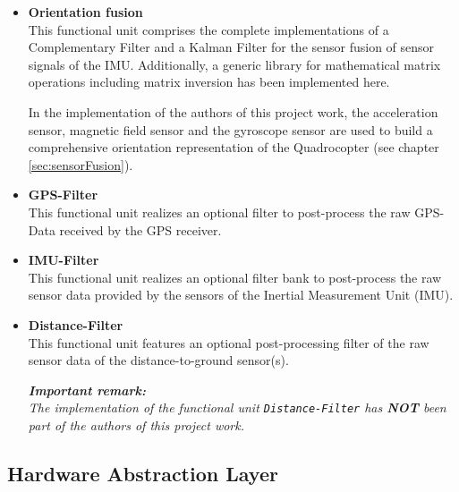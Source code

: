 \begin{itemize}
	\item \textbf{Orientation fusion}\\
	This functional unit comprises the complete implementations of a Complementary Filter and a Kalman Filter for the sensor fusion of sensor signals of the IMU. Additionally, a generic library for mathematical matrix operations including matrix inversion has been implemented here.
	
	In the implementation of the authors of this project work, the acceleration sensor, magnetic field sensor and the gyroscope sensor are used to build a comprehensive orientation representation of the Quadrocopter (see chapter \ref{sec:sensorFusion}).
	
	\item \textbf{GPS-Filter}\\
	This functional unit realizes an optional filter to post-process the raw GPS-Data received by the GPS receiver.
	
	\item \textbf{IMU-Filter}\\
	This functional unit realizes an optional filter bank to post-process the raw sensor data provided by the sensors of the Inertial Measurement Unit (IMU).
	
	\item \textbf{Distance-Filter}\\
	This functional unit features an optional post-processing filter of the raw sensor data of the distance-to-ground sensor(s).
	
	\textit{\textbf{Important remark:}\\
	The implementation of the functional unit \texttt{Distance-Filter} has \textbf{NOT} been part of the authors of this project work.}
	
\end{itemize}

\subsection{Hardware Abstraction Layer}
\label{sec:software:funcUnits:hal}

